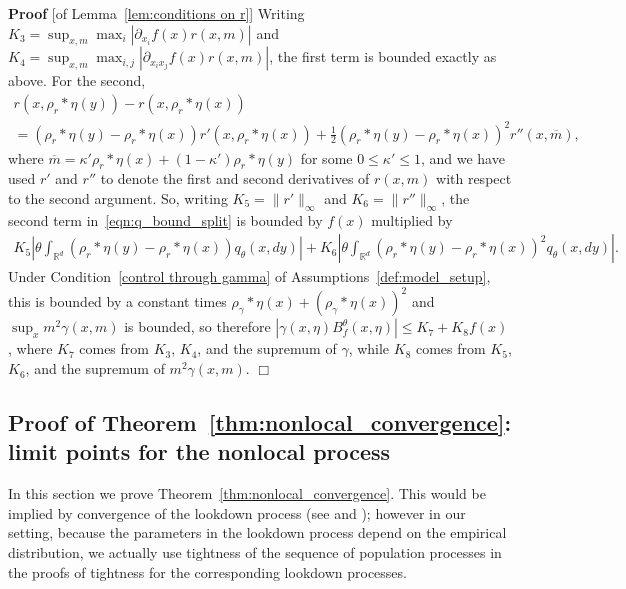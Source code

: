 \documentclass[12pt]{article}
\newenvironment {proof}{{\noindent\bf Proof }}{\hfill $\Box$ \medskip}
\newcommand{\IR}{\mathbb R}
\newcommand{\kernel}{\rho}  %
\newcommand{\smooth}[1]{\kernel_{#1} \! * \!}  %
\numberwithin{equation}{section}
\begin{document}
\begin{proof}[of Lemma~\ref{lem:conditions on r}]
 Writing
    $K_3 = \sup_{x,m} \max_i |\partial_{x_i} f(x)r(x, m)|$
    and 
    $K_4 = \sup_{x,m} \max_{i,j} |\partial_{x_i x_j} f(x)r(x, m)|$,
the first term is bounded exactly as above. For the second, 
    \begin{multline*}
        r(x, \smooth{r}\eta(y)) - r(x, \smooth{r}\eta(x))
        \\
=
        (\smooth{r}\eta(y) - \smooth{r}\eta(x)) r'(x,\smooth{r}\eta(x))
        + \frac{1}{2} (\smooth{r}\eta(y) - \smooth{r}\eta(x))^2 r''(x, \overline{m}),
    \end{multline*}
    where $\overline{m}= \kappa'\smooth{r}\eta(x) +(1-\kappa') 
\smooth{r}\eta(y)$ for some $0\leq \kappa'\leq 1$, and
    we have used $r'$ and $r''$ to denote the first and second derivatives of $r(x,m)$
with respect to the second argument.
    So, writing $K_5=\|r'\|_\infty$ and $K_6=\|r''\|_\infty$,
    the second term in~\eqref{eqn:q_bound_split} is bounded by $f(x)$ multiplied by
    \begin{align*}
       K_5
        \left|
            \theta \int_{\IR^d}
                (\smooth{r}\eta(y) - \smooth{r}\eta(x))
            q_\theta(x, dy)
        \right|
        +
       K_6
        \left|
            \theta \int_{\IR^d}
                (\smooth{r}\eta(y) - \smooth{r}\eta(x))^2
            q_\theta(x, dy)
        \right| .
    \end{align*}
Under Condition~\ref{control through gamma} of 
Assumptions~\ref{def:model_setup}, this is bounded by 
a constant times $\smooth{\gamma}\eta(x)+(\smooth{\gamma}\eta(x))^2$ and 
$\sup_x m^2\gamma(x, m)$ is bounded,
so therefore $|\gamma(x,\eta) B^\theta_f(x,\eta)| \le K_7 + K_8 f(x)$,
where $K_7$ comes from $K_3$, $K_4$, and the supremum of $\gamma$,
while $K_8$ comes from $K_5$, $K_6$, and the supremum of $m^2 \gamma(x,m)$.
\end{proof}


\subsection{Proof of Theorem~\ref{thm:nonlocal_convergence}: limit points for the nonlocal process}
    \label{sec:population_density_proof}

In this section we prove 
Theorem~\ref{thm:nonlocal_convergence}.
This would be implied by convergence of the lookdown process
(see \citet{kurtz/rodrigues:2011} and \citet{etheridge/kurtz:2019});
however in our setting,
because the parameters in the lookdown process
depend on the empirical distribution,
we actually use tightness of the sequence of population processes
in the proofs of tightness for the corresponding lookdown processes.
\end{document}
